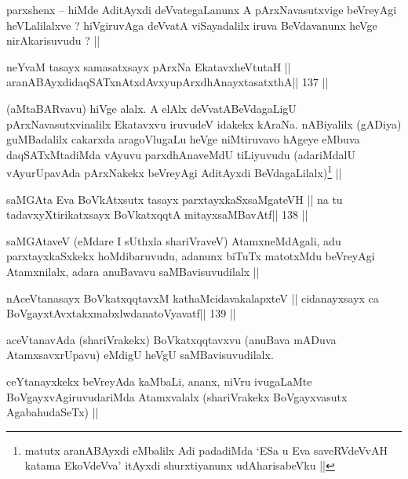 \begin{artha}
parxshenx -- hiMde AditAyxdi deVvategaLanunx A pArxNavasutxvige beVreyAgi heVLalilalxve ? hiVgiruvAga deVvatA viSayadalilx iruva BeVdavanunx heVge nirAkarisuvudu ? ||
\end{artha}


\begin{shl}
neYvaM tasayx samasatxsayx pArxNa EkatavxheVtutaH ||
aranABAyxdidaqSATxnAtxdAvxyupArxdhAnayxtasatxthA\hfill || 137 ||
\end{shl}

\begin{artha}
(aMtaBARvavu) hiVge alalx. A elAlx deVvatABeVdagaLigU 
pArxNavasutxvinalilx Ekatavxvu iruvudeV idakekx kAraNa. nABiyalilx 
(gADiya) guMBadalilx cakarxda aragoVlugaLu heVge niMtiruvavo hAgeye 
eMbuva daqSATxMtadiMda vAyuvu parxdhAnaveMdU tiLiyuvudu (adariMdalU 
vAyurUpavAda pArxNakekx beVreyAgi AditAyxdi 
BeVdagaLilalx)\footnote{matutx aranABAyxdi eMbalilx Adi padadiMda `ESa 
u Eva saveRVdeVvAH
 katama EkoVdeVva' itAyxdi shurxtiyanunx udAharisabeVku ||} ||
\end{artha}


\begin{shl}
saMGAta Eva BoVkAtx\s sutx tasayx parxtayxkaSxsaMgateVH ||
na tu tadavxyXtirikatxsayx BoVkatxqqtA mitayxsaMBavAtf\hfill || 138 ||
\end{shl}

\begin{artha}
saMGAtaveV (eMdare I sUthxla shariVraveV) AtamxneMdAgali, adu 
parxtayxkaSxkekx hoMdibaruvudu, adanunx biTuTx matotxMdu beVreyAgi Atamxnilalx, adara anuBavavu saMBavisuvudilalx ||
\end{artha}


\begin{shl}
nAceVtanasayx BoVkatxqqtavxM kathaMcidavakalapxteV ||
cidanayxsayx ca BoVgayxtAvxtakxmabxlwdanatoVyavatf\hfill || 139 ||
\end{shl}

\begin{artha}
aceVtanavAda (shariVrakekx) BoVkatxqqtavxvu (anuBava mADuva 
AtamxsavxrUpavu) eMdigU heVgU saMBavisuvudilalx.

ceYtanayxkekx beVreyAda kaMbaLi, ananx, niVru ivugaLaMte 
BoVgayxvAgiruvudariMda Atamxvalalx (shariVrakekx BoVgayxvasutx AgabahudaSeTx) ||
\end{artha}

